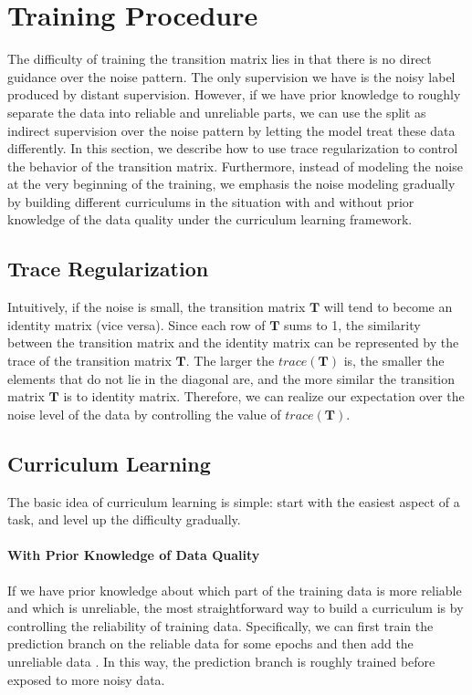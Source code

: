 \section{Training Procedure}
The difficulty of training the transition matrix lies in that there is no direct guidance over the noise pattern. The only supervision we have is the noisy label produced by distant supervision. However, if we have prior knowledge to roughly separate the data into reliable and unreliable parts, we can use the split as indirect supervision over the noise pattern by letting the model treat these data differently. In this section, we describe how to use trace regularization to control the behavior of the transition matrix. Furthermore, instead of modeling the noise at the very beginning of the training, we emphasis the noise modeling gradually by building different curriculums in the situation with and without prior knowledge of the data quality under the curriculum learning framework. 

\subsection{Trace Regularization}
Intuitively, if the noise is small, the transition matrix $\mathbf{T}$ will tend to become an identity matrix (vice versa).  Since each row of $\mathbf{T}$ sums to 1, the similarity between the transition matrix and the identity matrix can be represented by the trace of the transition matrix $\mathbf{T}$. The larger the $trace(\mathbf{T})$ is, the smaller the elements that do not lie in the diagonal are, and the more similar the transition matrix $\mathbf{T}$ is to identity matrix. Therefore, we can realize our expectation over the noise level of the data by controlling the value of $trace(\mathbf{T})$.

\subsection{Curriculum Learning}
The basic idea of curriculum learning is simple: start with the easiest aspect of a task, and level up the difficulty gradually.

\paragraph{With Prior Knowledge of Data Quality}
If we have prior knowledge about which part of the training data is more reliable and which is unreliable, the most straightforward way to build a curriculum is by controlling the reliability of training data. Specifically, we can first train the prediction branch on the reliable data for some epochs and then add the unreliable data . In this way, the prediction branch is roughly trained before exposed to more noisy data.

